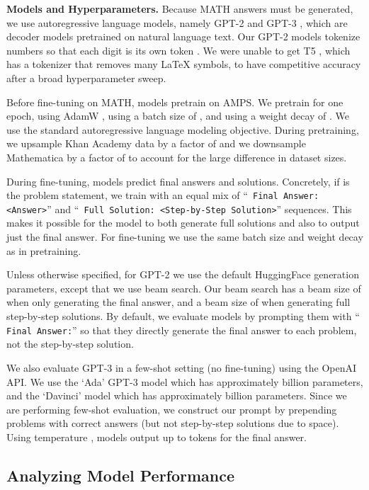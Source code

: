 \documentclass{article}
\begin{document}
\textbf{Models and Hyperparameters.}\quad
Because MATH answers must be generated, we use autoregressive language models, namely GPT-2 \citep{Radford2016UnsupervisedRL} and GPT-3 \citep{Brown2020LanguageMA}, which are decoder models pretrained on natural language text. Our GPT-2 models tokenize numbers so that each digit is its own token \citep{Henighan2020ScalingLF}. We were unable to get T5 \citep{Raffel2020ExploringTL}, which has a tokenizer that removes many \LaTeX{} symbols, to have competitive accuracy after a broad hyperparameter sweep.

Before fine-tuning on MATH, models pretrain on AMPS.
We pretrain for one epoch, using AdamW \citep{Loshchilov2019DecoupledWD}, using a batch size of , and using a weight decay of . We use the standard autoregressive language modeling objective. 
During pretraining, we upsample Khan Academy data by a factor of  and we downsample Mathematica by a factor of  to account for the large difference in dataset sizes.

During fine-tuning, models predict final answers and solutions. Concretely, if  is the problem statement, we train with an equal mix of ``\texttt{ Final Answer: <Answer>}'' and ``\texttt{ Full Solution: <Step-by-Step Solution>}'' sequences. This makes it possible for the model to both generate full solutions and also to output just the  final answer. For fine-tuning we use the same batch size and weight decay as in pretraining.

Unless otherwise specified, for GPT-2 we use the default HuggingFace \citep{wolf-etal-2020-transformers} generation parameters, except that we use beam search. Our beam search has a beam size of  when only generating the final answer, and a beam size of  when generating full step-by-step solutions. By default, we evaluate models by prompting them with ``\texttt{ Final Answer:}'' so that they directly generate the final answer to each problem, not the step-by-step solution.

We also evaluate GPT-3 in a few-shot setting (no fine-tuning) using the OpenAI API. We use the `Ada' GPT-3 model which has approximately  billion parameters, and the `Davinci' model which has approximately  billion parameters. Since we are performing few-shot evaluation, we construct our prompt by prepending  problems with correct answers (but not step-by-step solutions due to space). Using temperature , models output up to  tokens for the final answer. 

\subsection{Analyzing Model Performance}
\end{document}

